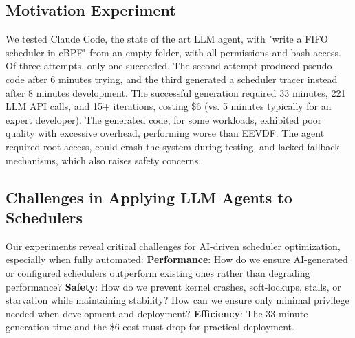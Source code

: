 \subsection{Motivation Experiment}

We tested Claude Code\cite{claudecode}, the state of the art LLM agent, with "write a FIFO scheduler in eBPF" from an empty folder, with all permissions and bash access. Of three attempts, only one succeeded. The second attempt produced pseudo-code after 6 minutes trying, and the third generated a scheduler tracer instead after 8 minutes development. The successful generation required 33 minutes, 221 LLM API calls, and 15+ iterations, costing \$6 (vs. 5 minutes typically for an expert developer). The generated code, for some workloads, exhibited poor quality with excessive overhead, performing worse than EEVDF. The agent required root access, could crash the system during testing, and lacked fallback mechanisms, which also raises safety concerns.

\subsection{Challenges in Applying LLM Agents to Schedulers}

Our experiments reveal critical challenges for AI-driven scheduler optimization, especially when fully automated: \textbf{Performance}: How do we ensure AI-generated or configured schedulers outperform existing ones rather than degrading performance? \textbf{Safety}: How do we prevent kernel crashes, soft-lockups, stalls, or starvation while maintaining stability? How can we ensure only minimal privilege needed when development and deployment? \textbf{Efficiency}: The 33-minute generation time and the \$6 cost must drop for practical deployment.

